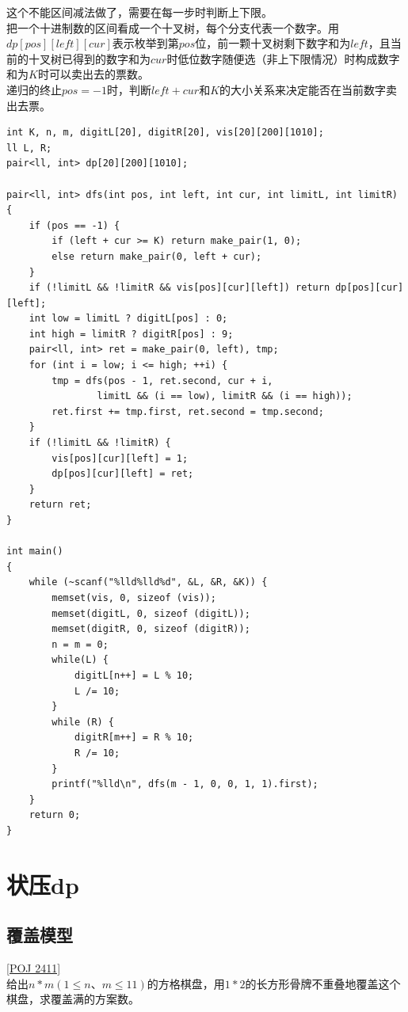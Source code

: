 这个不能区间减法做了，需要在每一步时判断上下限。 \\
把一个十进制数的区间看成一个十叉树，每个分支代表一个数字。用$dp[pos][left][cur]$表示枚举到第$pos$位，前一颗十叉树剩下数字和为$left$，且当前的十叉树已得到的数字和为$cur$时低位数字随便选（非上下限情况）时构成数字和为$K$时可以卖出去的票数。 \\
递归的终止$pos=-1$时，判断$left+cur$和$K$的大小关系来决定能否在当前数字卖出去票。  \\
\begin{lstlisting}
int K, n, m, digitL[20], digitR[20], vis[20][200][1010];
ll L, R;
pair<ll, int> dp[20][200][1010];

pair<ll, int> dfs(int pos, int left, int cur, int limitL, int limitR)
{
	if (pos == -1) {
		if (left + cur >= K) return make_pair(1, 0);
		else return make_pair(0, left + cur);
	}
	if (!limitL && !limitR && vis[pos][cur][left]) return dp[pos][cur][left];
	int low = limitL ? digitL[pos] : 0;
	int high = limitR ? digitR[pos] : 9;
	pair<ll, int> ret = make_pair(0, left), tmp;
	for (int i = low; i <= high; ++i) {
		tmp = dfs(pos - 1, ret.second, cur + i,
                limitL && (i == low), limitR && (i == high));
		ret.first += tmp.first, ret.second = tmp.second;
	}
	if (!limitL && !limitR) {
		vis[pos][cur][left] = 1;
		dp[pos][cur][left] = ret;
	}
	return ret;
}

int main()
{
	while (~scanf("%lld%lld%d", &L, &R, &K)) {
		memset(vis, 0, sizeof (vis));
		memset(digitL, 0, sizeof (digitL));
		memset(digitR, 0, sizeof (digitR));
		n = m = 0;
		while(L) {
			digitL[n++] = L % 10;
			L /= 10;
		}
		while (R) {
			digitR[m++] = R % 10;
			R /= 10;
		}
		printf("%lld\n", dfs(m - 1, 0, 0, 1, 1).first);
	}
	return 0;
}
\end{lstlisting}

\clearpage
\section{状压dp}

\subsection{覆盖模型}

\underline {[POJ 2411]} \\
给出$n*m(1\leq n、m\leq 11)$的方格棋盘，用$1*2$的长方形骨牌不重叠地覆盖这个棋盘，求覆盖满的方案数。\\

